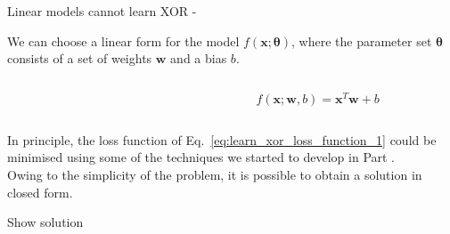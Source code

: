 %
%
%

\begin{frame}[t,allowframebreaks]{Linear models cannot learn XOR -} 

    We can choose a linear form for the model $f(\mathbf{x};\mathbf{\theta})$,
    where the parameter set $\mathbf{\theta}$ consists 
    of a set of weights $\mathbf{w}$ and a bias $b$.        

    \begin{columns}[t]
        \begin{column}{0.50\textwidth}
            \vspace{-0.6cm}
            \begin{center}
            \end{center}        
        \end{column}
        \begin{column}{0.50\textwidth}
            \begin{equation}
                f(\mathbf{x};\mathbf{w},b) = \mathbf{x}^{T} \mathbf{w} + b
                \label{eq:learn_xor_model_1}
            \end{equation}
        \end{column}
    \end{columns}
      
    In principle, the loss function of Eq.~\ref{eq:learn_xor_loss_function_1} 
    could be minimised using some of the techniques we started 
    to develop in Part \prevpart.\\
    
    Owing to the simplicity of the problem, 
    it is possible to obtain a solution in closed form.

    \framebreak

    {\color{red}Show solution}

\end{frame}
